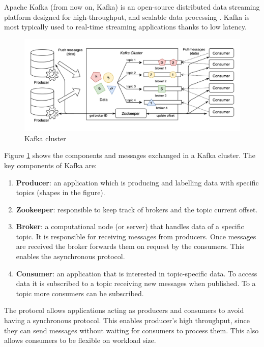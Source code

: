 Apache Kafka (from now on, Kafka) is an open-source distributed data streaming platform designed for high-throughput, and scalable data processing \cite{krepsKafkaDistributedMessaging2011}. Kafka is most typically used to real-time streaming applications thanks to low latency. 

\begin{figure}[!ht]
    \begin{center}
      \includegraphics[width=\textwidth]{figures/2-background/kafka.png}
    \end{center}
    \caption{Kafka cluster}
    \label{fig:kafka}
\end{figure}

Figure \ref{fig:kafka} shows the components and messages exchanged in a Kafka cluster. The key components of Kafka are:
\begin{enumerate}
    \item \textbf{Producer}: an application which is producing and labelling data with specific topics (shapes in the figure).
    \item \textbf{Zookeeper}: responsible to keep track of brokers and the topic current offset.
    \item \textbf{Broker}: a computational node (or server) that handles data of a specific topic. It is responsible for receiving messages from producers. Once messages are received the broker forwards them on request by the consumers. This enables the asynchronous protocol.
    \item \textbf{Consumer}: an application that is interested in topic-specific data. To access data it is subscribed to a topic receiving new messages when published. To a topic more consumers can be subscribed.
\end{enumerate}

The protocol allows applications acting as producers and consumers to avoid having a synchronous protocol. This enables producer's  high throughput, since they can send messages without waiting for consumers to process them. This also allows consumers to be flexible on workload size.

